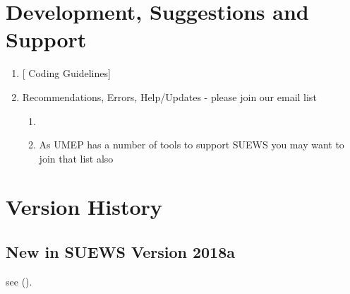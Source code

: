 \documentclass[letterpaper,10pt,english]{sphinxmanual}
\begin{document}
\chapter{Development, Suggestions and Support}
\label{\detokenize{development::doc}}\label{\detokenize{development:urban-multi-scale-environmental-predictor}}\label{\detokenize{development:development-suggestions-and-support}}\begin{enumerate}
\item {} 
{[}\textbar{}
Coding Guidelines{]}

\item {} 
Recommendations, Errors, Help/Updates - please join our email list
\begin{enumerate}
\item {} 

\item {} 
As UMEP has a number of tools to support SUEWS you may want to
join that list also

\end{enumerate}

\end{enumerate}


\chapter{Version History}
\label{\detokenize{version-history:version-history}}\label{\detokenize{version-history::doc}}\label{\detokenize{version-history:id1}}

\section{New in SUEWS Version 2018a}
\label{\detokenize{version-history:new-latest}}\label{\detokenize{version-history:new-in-suews-version-2018a}}
see {\hyperref[\detokenize{version-history:version-history}]{}} ().
\end{document}
